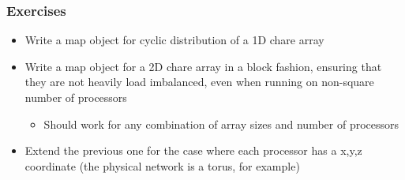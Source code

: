 \documentclass{beamer}
\begin{document}
\begin{frame}[fragile]
    \frametitle{Exercises}
    \begin{itemize}
        \item Write a map object for cyclic distribution of a 1D chare array
        \item Write a map object for a 2D chare array in a block fashion, ensuring that they are not heavily load imbalanced, even when running on non-square number of processors
        \begin{itemize}
            \item Should work for any combination of array sizes and number of processors
        \end{itemize}
        \item Extend the previous one for the case where each processor has a x,y,z coordinate (the physical network is a torus, for example)
    \end{itemize}
\end{frame}


\end{document}

